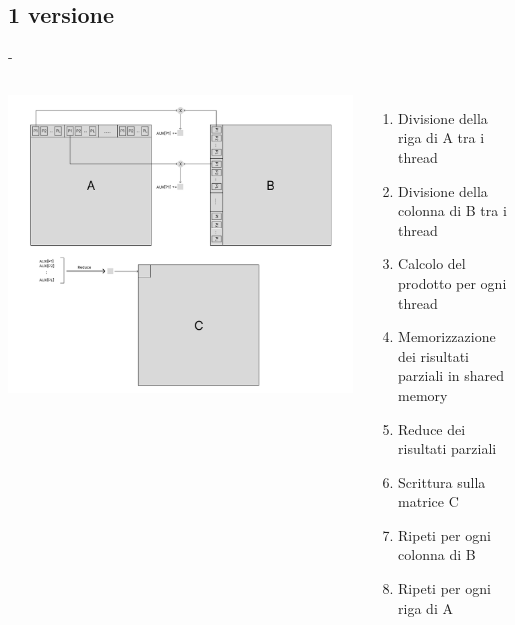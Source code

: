 \documentclass[compress]{beamer}
\begin{document}
\subsection{1 versione}
\begin{frame}{\secname \text{ }- \subsecname\ }
    \begin{columns}
            \begin{minipage}{1\textwidth}
                \begin{adjustbox}{margin=0cm 0cm 0cm 0cm, center} %
                    \includegraphics[width=1.2\textwidth]{resources/cuda_scheme_v1.png}
                \end{adjustbox}
            \end{minipage}
            \begin{minipage}[b]{1\textwidth}
                \begin{enumerate}
                    \item Divisione della riga di A tra i thread
                    \item Divisione della colonna di B tra i thread
                    \item Calcolo del prodotto per ogni thread
                    \item Memorizzazione dei risultati parziali in shared memory
                    \item Reduce dei risultati parziali
                    \item Scrittura sulla matrice C
                    \item Ripeti per ogni colonna di B
                    \item Ripeti per ogni riga di A
                \end{enumerate}
            \end{minipage}
    \end{columns}
\end{frame}
\end{document}
